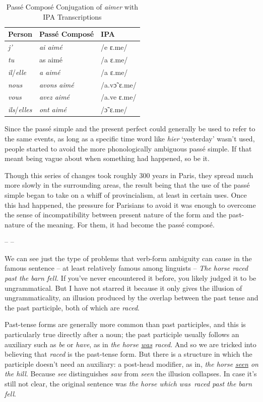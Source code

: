 \begin{table}[h]
\centering
\begin{tabular}{lll}
\hline
\textbf{Person} & \textbf{Passé Composé} & \textbf{IPA} \\
\hline
\textit{j'} & \textit{ai aimé} &/e ɛ.me/ \\
\textit{tu} & as aimé &/a ɛ.me/ \\
\textit{il}/\textit{elle} & \textit{a aimé } & /a ɛ.me/ \\
\textit{nous} & \textit{avons aimé} & /a.vɔ̃ ɛ.me/ \\
\textit{vous} & \textit{avez aimé} & /a.ve ɛ.me/ \\
\textit{ils}/\textit{elles} & \textit{ont aimé} & /ɔ̃ ɛ.me/ \\
\hline
\end{tabular}
\caption{Passé Composé Conjugation of \textit{aimer} with IPA Transcriptions}
\end{table}

Since the passé simple and the present perfect could generally be used to refer to the same events, as long as a specific time word like \textit{hier} `yesterday' wasn't used, people started to avoid the more phonologically ambiguous passé simple. If that meant being vague about when something had happened, so be it.

Though this series of changes took roughly 300 years in Paris, they spread much more slowly in the surrounding areas, the result being that the use of the passé simple began to take on a whiff of provincialism, at least in certain uses. Once this had happened, the pressure for Parisians to avoid it was enough to overcome the sense of incompatibility between present nature of the form and the past-nature of the meaning. For them, it had become the passé composé.

\begin{center}
    -- --
\end{center}

We can see just the type of problems that verb-form ambiguity can cause in the famous sentence -- at least relatively famous among linguists -- \textit{The horse raced past the barn fell.} If you've never encountered it before, you likely judged it to be ungrammatical. But I have not starred it because it only gives the illusion of ungrammaticality, an illusion produced by the overlap between the past tense and the past participle, both of which are \textit{raced}.

Past-tense forms are generally more common than past participles, and this is particularly true directly after a noun; the past participle usually follows an auxiliary such as \textit{be} or \textit{have}, as in \textit{the horse \uline{was} raced}. And so we are tricked into believing that \textit{raced} is the past-tense form. But there is a structure in which the participle doesn't need an auxiliary: a post-head modifier, as in, \textit{the horse \uline{seen} on the hill}. Because \textit{see} distinguishes \textit{saw} from \textit{seen} the illusion collapses. In case it's still not clear, the original sentence was \textit{the horse \op which was\cp~raced past the barn fell}.

